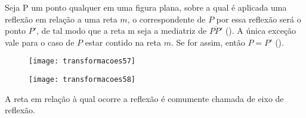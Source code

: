 Seja P um ponto qualquer em uma figura plana, sobre a qual é aplicada uma reflexão em relação a uma reta $m$, o correspondente de $P$ por essa reflexão será o ponto $P'$, de tal modo que a reta m seja a mediatriz de $\overline{PP'}$ (). A única exceção vale para o caso de $P$ estar contido na reta $m$. Se for assim, então $P = P'$ ().
 
\begin{multicols}{2}
\begin{figure}[H]
\centering

\texttt{[image: transformacoes57]}
\caption{}
\label{transformacoes57}
\end{figure}

\begin{figure}[H]
\centering

\texttt{[image: transformacoes58]}
\caption{}
\label{transformacoes58}
\end{figure}
\end{multicols}

A reta em relação à qual ocorre a reflexão é comumente chamada de eixo de reflexão.

